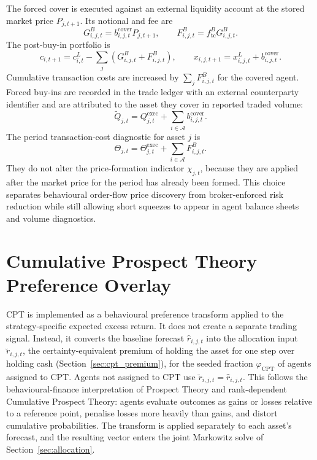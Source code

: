 \documentclass[12pt, a4paper]{article}
\begin{document}
    The forced cover is executed against an external liquidity account at the
    stored market price \(P_{j,t+1}\). Its notional and fee are
    \[
        G_{i,j,t}^{B}=b_{i,j,t}^{\text{cover}}P_{j,t+1},
        \qquad
        F_{i,j,t}^{B}=f_{\mathrm{tc}}^{B}G_{i,j,t}^{B}.
    \]
    The post-buy-in portfolio is
    \[
        c_{i,t+1}=c_{i,t}^{L}-\sum_{j}\left(G_{i,j,t}^{B}+F_{i,j,t}^{B}\right),
        \qquad
        x_{i,j,t+1}=x_{i,j,t}^{L}+b_{i,j,t}^{\text{cover}}.
    \]
    Cumulative transaction costs are increased by \(\sum_j F_{i,j,t}^{B}\) for the
    covered agent.
    Forced buy-ins are recorded in the trade ledger with an external counterparty
    identifier and are attributed to the asset they cover in reported traded
    volume:
    \[
        \widetilde Q_{j,t}
        =
        Q_{j,t}^{\text{exec}}
        +
        \sum_{i\in\mathcal{A}} b_{i,j,t}^{\text{cover}}.
    \]
    The period transaction-cost diagnostic for asset \(j\) is
    \[
        \Theta_{j,t}=\Theta_{j,t}^{\mathrm{exec}}+\sum_{i\in\mathcal{A}}F_{i,j,t}^{B}.
    \]
    They do not alter the price-formation indicator \(\chi_{j,t}\), because they
    are applied after the market price for the period has already been formed. This
    choice separates behavioural order-flow price discovery from broker-enforced
    risk reduction while still allowing short squeezes to appear in agent balance
    sheets and volume diagnostics.

    \section{Cumulative Prospect Theory Preference Overlay}\label{sec:cpt}

    CPT is implemented as a behavioural preference transform applied to the
    strategy-specific expected excess return. It does not create a separate trading
    signal. Instead, it converts the baseline forecast \(\hat r_{i,j,t}\) into the
    allocation input \(\breve r_{i,j,t}\), the certainty-equivalent premium of
    holding the asset for one step over holding cash
    (Section~\ref{sec:cpt_premium}), for the seeded fraction
    \(\varphi_{\mathrm{CPT}}\) of agents assigned to CPT\@. Agents not assigned to
    CPT use \(\breve r_{i,j,t}=\hat r_{i,j,t}\). This follows the
    behavioural-finance interpretation of Prospect Theory and rank-dependent
    Cumulative Prospect Theory: agents evaluate outcomes as gains or losses
    relative to a reference point, penalise losses more heavily than gains, and
    distort cumulative probabilities. The transform is applied separately to each
    asset's forecast, and the resulting vector enters the joint Markowitz solve of
    Section~\ref{sec:allocation}.
\end{document}
